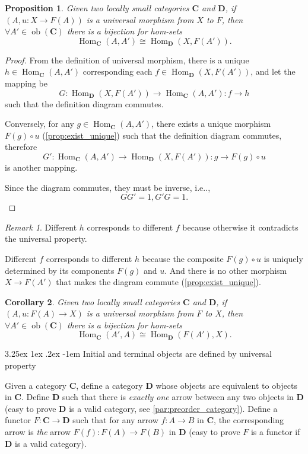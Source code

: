 \documentclass[12pt, letterpaper]{article}
\makeatletter
\renewcommand\subparagraph{\@startsection{subparagraph}{5}{\parindent}%
	{3.25ex \@plus1ex \@minus .2ex}%
	{0.75ex plus 0.1ex}%
	{\normalfont\normalsize\bfseries}}
\newcommand{\ob}{\operatorname{ob}}
\newcommand{\Hom}{\operatorname{Hom}}
\newcommand{\bfC}{\mathbf{C}}
\newcommand{\bfD}{\mathbf{D}}
\newcommand\ie{i.e\@ifnextchar.{}{.\@}}
\newtheorem{prop}{Proposition}[section]
\newtheorem{cor}[prop]{Corollary}
\renewcommand\subparagraph{\@startsection{subparagraph}{5}{\parindent}%
	{3.25ex \@plus1ex \@minus .2ex}%
	{-1em}%
	{\normalfont\normalsize\bfseries}}
\theoremstyle{definition}
\theoremstyle{remark}
\newtheorem*{rem*}{Remark}
\theoremstyle{definition}
\theoremstyle{plain}
\numberwithin{equation}{section}
\makeatother
\begin{document}
	\begin{prop}\label{prop:same_arrows}
		Given two locally small categories $\bfC$ and $\bfD$,
		if $(A,u\colon X\to F(A))$ is a universal morphism from $X$ to $F$,
		then $\forall A'\in \ob(\bfC)$ there is a bijection for hom-sets
		\[ \Hom_\bfC(A,A')\cong \Hom_\bfD(X,F(A')). \]
	\end{prop}
	\begin{proof}
		From the definition of universal morphism,
		there is a unique $h\in \Hom_\bfC(A,A')$ corresponding
		each $f\in \Hom_\bfD(X,F(A'))$, and let the mapping be
		\[ G\colon\Hom_\bfD(X,F(A'))\to  \Hom_\bfC(A,A')\colon f\to h  \]
		such that the definition diagram commutes.
		
		Conversely, for any $g\in \Hom_\bfC(A,A')$, there exists a unique
		morphism $ F(g) \circ u $ (\ref{prop:exist_unique}) such that the definition diagram commutes,
		therefore
		\[ G'\colon\Hom_\bfC(A,A')\to  \Hom_\bfD(X,F(A')) \colon g\to F(g) \circ u   \]
		is another mapping.
		
		Since the diagram commutes, they must be inverse, \ie,
		\[ GG'=1, G'G=1. \]
	\end{proof}
	\begin{rem*}
		Different $h$ corresponds to different $f$
		because otherwise it contradicts the universal property.
		
		Different $f$ corresponds to different $h$
		because the composite $F(g)\circ u$ is uniquely determined by its components $F(g)$ and $u$.
		And there is no other morphism $X\to F(A')$ that makes the diagram commute (\ref{prop:exist_unique}).
	\end{rem*}

	\begin{cor}\label{prop:same_arrows_from_F_to_X}
		Given two locally small categories $\bfC$ and $\bfD$,
		if $(A,u\colon F(A)\to X)$ is a universal morphism from $F$ to $X$,
		then $\forall A'\in \ob(\bfC)$ there is a bijection for hom-sets
		\[ \Hom_\bfC(A',A)\cong \Hom_\bfD(F(A'),X). \]
	\end{cor}
	
	\subparagraph{Initial and terminal objects are defined by universal property}
	
	Given a category $\bfC$, define a category $\bfD$ whose objects are equivalent to objects in $\bfC$.
	Define $\bfD$ such that
	there is \textit{exactly one} arrow between any two objects in $\bfD$ (easy to prove $\bfD$ is a valid category,
	see \ref{par:preorder_category}).
	Define a functor $F\colon \bfC\to\bfD$ such that for any arrow $f\colon A\to B$ in $\bfC$,
	the corresponding arrow is \textit{the} arrow $F(f)\colon F(A)\to F(B)$ in $\bfD$ (easy to prove $F$ is a functor if $\bfD$ is a valid category).
	
\end{document}
